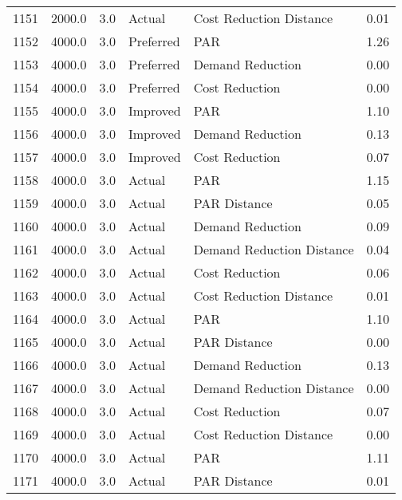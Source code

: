 \begin{longtable}{lrrllr}
1151 &       2000.0 &     3.0 &         Actual &    Cost Reduction Distance &   0.01 \\
1152 &       4000.0 &     3.0 &      Preferred &                        PAR &   1.26 \\
1153 &       4000.0 &     3.0 &      Preferred &           Demand Reduction &   0.00 \\
1154 &       4000.0 &     3.0 &      Preferred &             Cost Reduction &   0.00 \\
1155 &       4000.0 &     3.0 &       Improved &                        PAR &   1.10 \\
1156 &       4000.0 &     3.0 &       Improved &           Demand Reduction &   0.13 \\
1157 &       4000.0 &     3.0 &       Improved &             Cost Reduction &   0.07 \\
1158 &       4000.0 &     3.0 &         Actual &                        PAR &   1.15 \\
1159 &       4000.0 &     3.0 &         Actual &               PAR Distance &   0.05 \\
1160 &       4000.0 &     3.0 &         Actual &           Demand Reduction &   0.09 \\
1161 &       4000.0 &     3.0 &         Actual &  Demand Reduction Distance &   0.04 \\
1162 &       4000.0 &     3.0 &         Actual &             Cost Reduction &   0.06 \\
1163 &       4000.0 &     3.0 &         Actual &    Cost Reduction Distance &   0.01 \\
1164 &       4000.0 &     3.0 &         Actual &                        PAR &   1.10 \\
1165 &       4000.0 &     3.0 &         Actual &               PAR Distance &   0.00 \\
1166 &       4000.0 &     3.0 &         Actual &           Demand Reduction &   0.13 \\
1167 &       4000.0 &     3.0 &         Actual &  Demand Reduction Distance &   0.00 \\
1168 &       4000.0 &     3.0 &         Actual &             Cost Reduction &   0.07 \\
1169 &       4000.0 &     3.0 &         Actual &    Cost Reduction Distance &   0.00 \\
1170 &       4000.0 &     3.0 &         Actual &                        PAR &   1.11 \\
1171 &       4000.0 &     3.0 &         Actual &               PAR Distance &   0.01 \\

\end{longtable}
